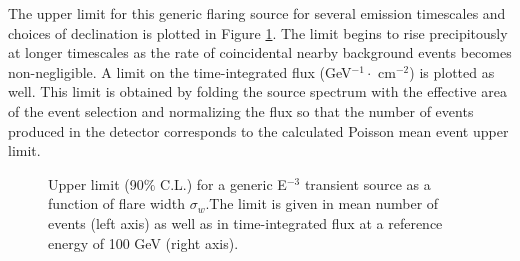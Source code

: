 \documentclass[manuscript]{aastex}
\begin{document}
The upper limit for this generic flaring source for several emission timescales and choices of declination is plotted in Figure \ref{fig:GenericE3Limit}. The limit begins to rise precipitously at longer timescales as the rate of coincidental nearby background events becomes non-negligible. A limit on the time-integrated flux (GeV$^{-1} \cdot$ cm$^{-2}$) is plotted as well. This limit is obtained by folding the source spectrum with the effective area of the event selection and normalizing the flux so that the number of events produced in the detector corresponds to the calculated Poisson mean event upper limit. 

\begin{figure}[ht]
\caption[Time-integrated Flux Limit for E$^{-3}$ Source]{Upper limit (90$\%$ C.L.) for a generic E$^{-3}$ transient source as a function of flare width $\sigma_w$.The limit is given in mean number of events (left axis) as well as in time-integrated flux at a reference energy of 100 GeV (right axis).}
\label{fig:GenericE3Limit}
\end{figure}
\end{document}
